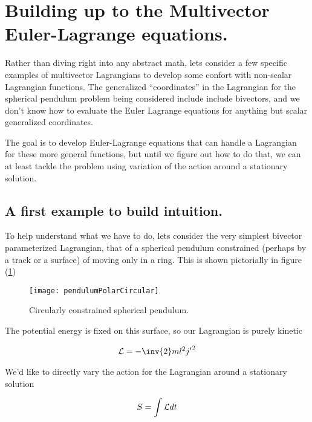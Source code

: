 \section{Building up to the Multivector Euler-Lagrange equations.}

Rather than diving right into any abstract math, lets consider a few specific examples of multivector Lagrangians to develop some confort with non-scalar Lagrangian functions.  The generalized ``coordinates'' in the Lagrangian for the spherical pendulum problem being considered include include bivectors, and we don't know how to evaluate the Euler Lagrange equations for anything but scalar generalized coordinates.

The goal is to develop Euler-Lagrange equations that can handle a Lagrangian for these more general functions, but until we figure out how to do that, we can at least tackle the problem using variation of the action around a stationary solution.

\subsection{A first example to build intuition.}

To help understand what we have to do, lets consider the very simplest bivector parameterized Lagrangian, that of a spherical pendulum constrained (perhaps by a track or a surface) of moving only in a ring.  This is shown pictorially in figure (\ref{fig:sPolarMultiPendulum:pendulumPolarCircular})

\begin{figure}[htp]
\centering
\texttt{[image: pendulumPolarCircular]}
\caption{Circularly constrained spherical pendulum.}\label{fig:sPolarMultiPendulum:pendulumPolarCircular}
\end{figure}

The potential energy is fixed on this surface, so our Lagrangian is purely kinetic

\begin{align}\label{eqn:sPolarMultiPendulum:noo1}
\LL = -\inv{2} m l^2 {j'}^2
\end{align}

We'd like to directly vary the action for the Lagrangian around a stationary solution

\begin{align}\label{eqn:sPolarMultiPendulum:noo2}
S = \int \mathcal{L} dt
\end{align}

